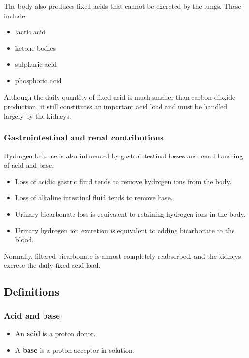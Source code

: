 \documentclass[11pt,a4paper]{article}
\begin{document}
The body also produces fixed acids that cannot be excreted by the lungs. These include:

\begin{itemize}
    \item lactic acid
    \item ketone bodies
    \item sulphuric acid
    \item phosphoric acid
\end{itemize}

Although the daily quantity of fixed acid is much smaller than carbon dioxide production, it still constitutes an important acid load and must be handled largely by the kidneys.

\subsubsection{Gastrointestinal and renal contributions}

Hydrogen balance is also influenced by gastrointestinal losses and renal handling of acid and base.

\begin{itemize}
    \item Loss of acidic gastric fluid tends to remove hydrogen ions from the body.
    \item Loss of alkaline intestinal fluid tends to remove base.
    \item Urinary bicarbonate loss is equivalent to retaining hydrogen ions in the body.
    \item Urinary hydrogen ion excretion is equivalent to adding bicarbonate to the blood.
\end{itemize}

Normally, filtered bicarbonate is almost completely reabsorbed, and the kidneys excrete the daily fixed acid load.

\subsection{Definitions}

\subsubsection{Acid and base}

\begin{itemize}
    \item An \textbf{acid} is a proton donor.
    \item A \textbf{base} is a proton acceptor in solution.
\end{itemize}
\end{document}
